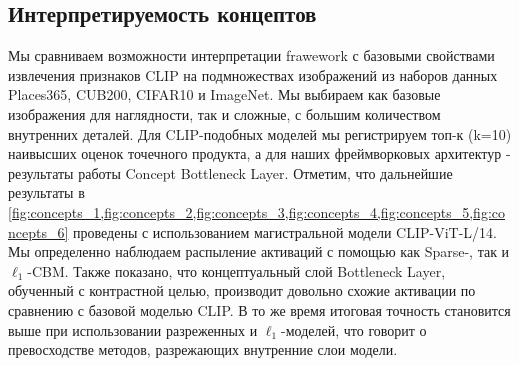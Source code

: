 \subsection{Интерпретируемость концептов}
\label{sec:concepts_interpretability}
Мы сравниваем возможности интерпретации frawework с базовыми свойствами извлечения признаков CLIP на подмножествах изображений из наборов данных Places365, CUB200, CIFAR10 и ImageNet. Мы выбираем как базовые изображения для наглядности, так и сложные, с большим количеством внутренних деталей. Для CLIP-подобных моделей мы регистрируем топ-к (k=10) наивысших оценок точечного продукта, а для наших фреймворковых архитектур - результаты работы Concept Bottleneck Layer. Отметим, что дальнейшие результаты в \cref{fig:concepts_1,fig:concepts_2,fig:concepts_3,fig:concepts_4,fig:concepts_5,fig:concepts_6} проведены с использованием магистральной модели CLIP-ViT-L/14. Мы определенно наблюдаем распыление активаций с помощью как Sparse-, так и $\ell_1$-CBM. Также показано, что концептуальный слой Bottleneck Layer, обученный с контрастной целью, производит довольно схожие активации по сравнению с базовой моделью CLIP. В то же время итоговая точность становится выше при использовании разреженных и $\ell_1$-моделей, что говорит о превосходстве методов, разрежающих внутренние слои модели.

